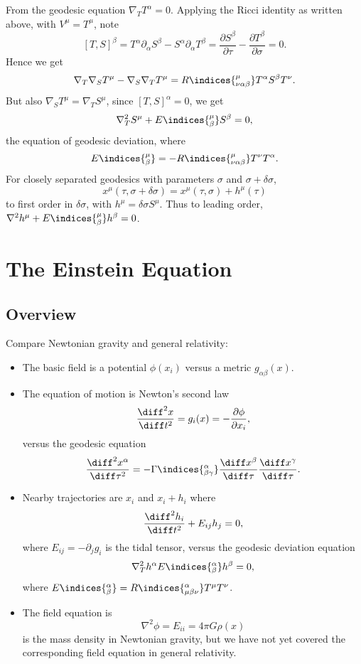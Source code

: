 \documentclass[12pt]{article}
\begin{document}
From the geodesic equation $\nabla _T T^\alpha = 0$. Applying the Ricci identity as written above, with $V^\mu = T^\mu$, note
\[
	[T, S]^\beta = T^\alpha \partial_\alpha S^\beta - S^\alpha \partial_\alpha T^\beta = \frac{\partial S^\beta}{\partial \tau} - \frac{\partial T^\beta}{\partial \sigma} = 0.
\]
Hence we get
\[
\nabla_T \nabla_S T^\mu - \nabla_S \nabla_T T^\mu = R\indices{^{\mu}_{\nu\alpha\beta}} T^\alpha S^\beta T^\nu.
\]
But also $\nabla_S T^\mu = \nabla_T S^\mu$, since $[T, S]^\alpha = 0$, we get
\[
\nabla_T^2 S^\mu + E\indices{^{\mu}_{\beta}} S^\beta = 0,
\]
the equation of geodesic deviation, where 
\[
E\indices{^{\mu}_{\beta}} = - R\indices{^{\mu}_{\nu\alpha\beta}}T^\nu T^\alpha.
\]
For closely separated geodesics with parameters $\sigma$ and $\sigma + \delta \sigma$,
\[
x^\mu(\tau, \sigma + \delta \sigma) = x^\mu(\tau, \sigma) + h^\mu(\tau)
\]
to first order in $\delta \sigma$, with $h^\mu = \delta \sigma S^\mu$. Thus to leading order, $\nabla^2 h^\mu + E\indices{^{\mu}_{\beta}} h^\beta = 0$.

\newpage

\section{The Einstein Equation}
\label{sec:ee}

\subsection{Overview}
\label{sub:ov}

Compare Newtonian gravity and general relativity:
\begin{itemize}
	\item The basic field is a potential $\phi(x_i)$ versus a metric $g_{\alpha\beta}(x)$.
	\item The equation of motion is Newton's second law
		\[
		\frac{\diff^2 x}{\diff t^2} = g_i(x) = - \frac{\partial \phi}{\partial x_i},
		\]
		versus the geodesic equation
		\[
		\frac{\diff^2 x^\alpha}{\diff \tau^2} = - \Gamma\indices{^{\alpha}_{\beta\gamma}} \frac{\diff x^\beta}{\diff \tau} \frac{\diff x^\gamma}{\diff \tau}.
		\]
	\item Nearby trajectories are $x_i$ and $x_i + h_i$ where
		\[
		\frac{\diff^2 h_i}{\diff t^2} + E_{ij} h_j = 0,
		\]
		where $E_{ij} = - \partial_j g_i$ is the tidal tensor, versus the geodesic deviation equation
		\[
		\nabla_T^2 h^\alpha E\indices{^{\alpha}_{\beta}} h^\beta = 0,
		\]
		where $E\indices{^{\alpha}_{\beta}} = R\indices{^{\alpha}_{\mu\beta\nu}} T^\mu T^\nu$.
	\item The field equation is
		\[
		\nabla^2 \phi = E_{ii} = 4 \pi G \rho(x)
		\]
		is the mass density in Newtonian gravity, but we have not yet covered the corresponding field equation in general relativity.
\end{itemize}
\end{document}
